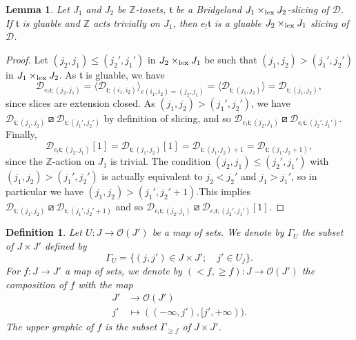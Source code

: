 \documentclass{article}
\newtheorem{lem}[thm]{Lemma}
\newtheorem{defn}[thm]{Definition}
\theoremstyle{definition}
\newcommand{\Z}{\mathbb{Z}}
\newcommand{\Oo}{\mathcal{O}}
\newcommand{\tee}{\mathfrak{t}}
\newcommand{\orth}{\boxslash}
\newcommand{\gr}{\Gamma}
\newcommand{\lex}{\times_{\textnormal{lex}}}
\begin{document}
\begin{lem}\label{incolla2}
Let $J_1$  and $J_2$ be $\Z$-tosets, $\tee$ be a Bridgeland $J_1 \lex J_2$-slicing of $\mathscr{D}$. If $\tee$ is gluable and $\Z$ acts trivially on $J_1$, then $e_! \tee$ is a gluable $J_2 \lex J_1$ slicing of $\mathscr{D}$. 
\end{lem}
\begin{proof}
Let $(j_2,j_1)\leq (j_2',j_1')$ in $J_2 \lex J_1$ be such that $(j_1,j_2)>(j_1',j_2')$ in $J_1 \lex J_2$. 
As $\tee$ is gluable, we have
\[
\mathscr{D}_{e_!\tee;(j_2,j_1)}=\langle \mathscr{D}_{\tee;(i_1,i_2)}\rangle_{e(i_1,i_2)=(j_2,j_1)}=\langle \mathscr{D}_{\tee;(j_1,j_2)}\rangle=\mathscr{D}_{\tee;(j_1,j_2)},
\]
since slices are extension closed. As $(j_1,j_2)>(j_1',j_2')$, we have $\mathscr{D}_{\tee;(j_1,j_2)}\orth \mathscr{D}_{\tee;(j_1',j_2')}$ by definition of slicing, and so $\mathscr{D}_{e_!\tee;(j_2,j_1)}\orth\mathscr{D}_{e_!\tee;(j_2',j_1')}$. Finally, 
\[
\mathscr{D}_{e_!\tee;(j_2,j_1)}[1]=\mathscr{D}_{\tee;(j_1,j_2)}[1]=\mathscr{D}_{\tee;(j_1,j_2)+1}=\mathscr{D}_{\tee;(j_1,j_2+1)},
\]
since the $\Z$-action on $J_1$ is trivial. The condition $(j_2,j_1)\leq (j_2',j_1')$ with $(j_1,j_2)>(j_1',j_2')$ is actually equivalent to $j_2<j_2'$ and $j_1>j_1'$, so in particular we have $(j_1,j_2)>(j_1',j_2'+1)$.This implies $\mathscr{D}_{\tee;(j_1,j_2)}\orth \mathscr{D}_{\tee;(j_1',j_2'+1)}$ and so $\mathscr{D}_{e_!\tee;(j_2,j_1)}\orth\mathscr{D}_{e_!\tee;(j_2',j_1')}[1]$.
\end{proof}

\begin{defn}
Let $U\colon J \to \Oo(J')$ be a map of sets. We denote by $\gr_{U}$ the subset of $J\times J'$ defined by 
 $$\gr_U=\{ (j,j') \in J \times J'; \quad j' \in U_{j} \}.$$
 For $f\colon J\to J'$ a map of sets, we denote by $(<f,\geq f)\colon J \to \Oo(J')$ the composition of $f$ with the map
 \begin{align*}
 J'&\to \Oo(J')\\
 j'&\mapsto ((-\infty,j'),[j',+\infty)).
 \end{align*}
 The upper graphic of $f$ is the subset $\gr_{\geq f}$ of $J\times J'$.
\end{defn}
  
\end{document}
